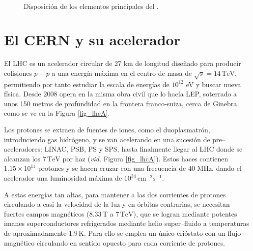 \vspace*{\fill}

\begin{figure}[H]
\centering
{} \\ \vfill
{}  \vfill
\caption{Disposición de los elementos principales del \lhc.} \label{fig_lhc}
\end{figure}

\vspace*{\fill}

\newpage


\section{El CERN y su acelerador \lhc} %


El LHC es un acelerador circular de 27 km de longitud diseñado para producir colisiones $p-p$ a una energía máxima en el centro de masa de $\sqrt{s} = 14 \, \mathrm{TeV}$, permitiendo por tanto estudiar la escala de energías de $10^{12}$ eV y buscar nueva física. \color{vero} Desde 2008 opera en la misma obra civil que lo hacía LEP, \color{norm} soterrado a unos 150 metros de profundidad en la frontera franco-suiza, cerca de Ginebra como se ve en la Figura \ref{fig_lhcA}.

Los protones se extraen de fuentes de iones, como el duoplasmatrón, introduciendo gas hidrógeno,
y se van acelerando en una sucesión de  pre--aceleradores: LINAC, PSB, PS y  SPS, hasta finalmente llegar al LHC donde se alcanzan los $7 \, \mathrm{TeV}$ por haz (\emph{vid.} Figura \ref{fig_lhcA}).
%
Estos haces contienen $1.15 \times  10^{11}$ protones y se hacen cruzar con una frecuencia de $40$ MHz, dando el acelerador una luminosidad máxima de $10^{34} \, \mathrm{cm^{-2}s^{-1}}$.


A estas energías tan altas, para mantener a las dos corrientes de protones circulando a casi la velocidad de la luz y en órbitas contrarias, se necesitan fuertes campos magnéticos ($8.33 \, \mathrm{T}$ a $7 \, \mathrm{TeV}$), que se logran mediante potentes imanes superconductores refrigerados mediante helio super--fluido a  temperaturas de aproximadamente $1.9 \, \text{K}$. Para ello se  emplea un único crióstato con un flujo magnético circulando en sentido opuesto para cada corriente de protones.
 






